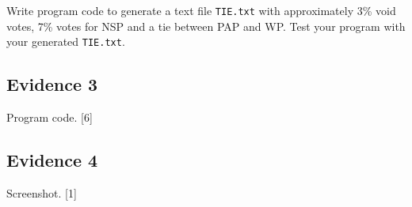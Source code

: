 Write program code to generate a text file \texttt{TIE.txt} with approximately
3\% void votes, 7\% votes for NSP and a tie between PAP and WP. Test
your program with your generated \texttt{TIE.txt}. 

\subsection*{Evidence 3 }

Program code.\hfill{} {[}6{]}

\subsection*{Evidence 4 }

Screenshot. \hfill{}{[}1{]}